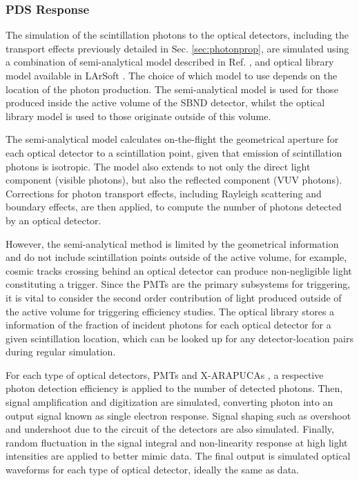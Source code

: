 \subsubsection{PDS Response}

The simulation of the scintillation photons to the optical detectors, including the transport effects previously detailed in Sec. \ref{sec:photonprop}, are simulated using a combination of semi-analytical model described in Ref. \cite{}, and optical library model available in LArSoft \cite{}.
The choice of which model to use depends on the location of the photon production.
The semi-analytical model is used for those produced inside the active volume of the SBND detector, whilst the optical library model is used to those originate outside of this volume.

The semi-analytical model calculates on-the-flight the geometrical aperture for each optical detector to a scintillation point, given that emission of scintillation photons is isotropic.
The model also extends to not only the direct light component (visible photons), but also the reflected component (VUV photons). 
Corrections for photon transport effects, including Rayleigh scattering and boundary effects, are then applied, to compute the number of photons detected by an optical detector.

However, the semi-analytical method is limited by the geometrical information and do not include scintillation  points outside of the active volume, for example, cosmic tracks crossing behind an optical detector can produce non-negligible light constituting a trigger.
Since the PMTs are the primary subsystems for triggering, it is vital to consider the second order contribution of light produced outside of the active volume for triggering efficiency studies.
The optical library stores a information of the fraction of incident photons for each optical detector for a given scintillation location, which can be looked up for any detector-location pairs during regular simulation. 

For each type of optical detectors, PMTs and X-ARAPUCAs , a respective photon detection efficiency is applied to the number of detected photons.
Then, signal amplification and digitization are simulated, converting photon into an output signal known as single electron response.
Signal shaping such as overshoot and undershoot due to the circuit of the detectors are also simulated.
Finally, random fluctuation in the signal integral and non-linearity response at high light intensities are applied to better mimic data.
The final output is simulated optical waveforms for each type of optical detector, ideally the same as data. 


